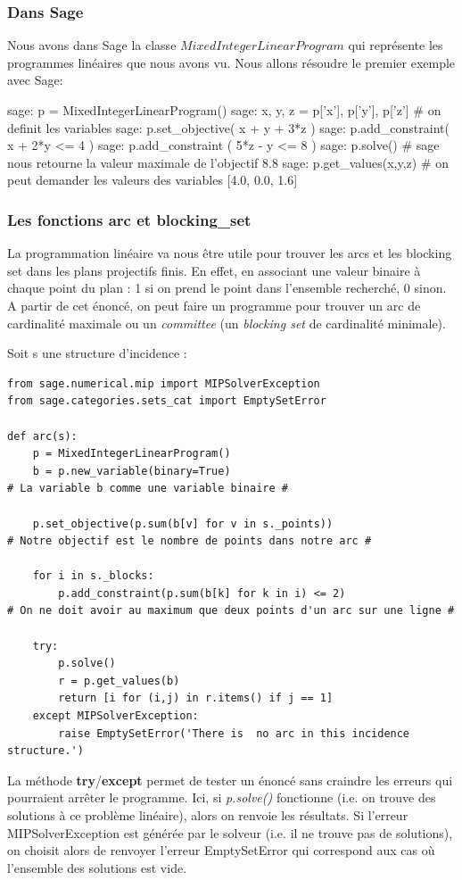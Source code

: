 \documentclass[a4paper]{article}
\begin{document}
\subsubsection{Dans Sage}
Nous avons dans Sage la classe $MixedIntegerLinearProgram$ qui représente les programmes linéaires que nous avons vu.
Nous allons résoudre le premier exemple avec Sage:
\begin{sageverbatim}
sage: p = MixedIntegerLinearProgram()
sage: x, y, z = p['x'], p['y'], p['z']    # on definit les variables
sage: p.set_objective( x + y + 3*z )
sage: p.add_constraint( x + 2*y <= 4 )
sage: p.add_constraint ( 5*z - y <= 8 )
sage: p.solve()         # sage nous retourne la valeur maximale de l'objectif
8.8
sage: p.get_values(x,y,z)    # on peut demander les valeurs des variables
[4.0, 0.0, 1.6]
\end{sageverbatim}
\subsubsection{Les fonctions arc et blocking\_set}
La programmation linéaire va nous être utile pour trouver les arcs et les blocking set dans les plans projectifs finis. En effet, en associant une valeur binaire à chaque point du plan : 1 si on prend le point dans l'ensemble recherché, 0 sinon.\\
A partir de cet énoncé, on peut faire un programme pour trouver un arc de cardinalité maximale ou un \textit{committee} (un \textit{blocking set} de cardinalité minimale).

Soit s une structure d'incidence :

\begin{lstlisting}
from sage.numerical.mip import MIPSolverException
from sage.categories.sets_cat import EmptySetError
          
def arc(s):   
    p = MixedIntegerLinearProgram()
    b = p.new_variable(binary=True)
# La variable b comme une variable binaire #

    p.set_objective(p.sum(b[v] for v in s._points))
# Notre objectif est le nombre de points dans notre arc #

    for i in s._blocks:
        p.add_constraint(p.sum(b[k] for k in i) <= 2)
# On ne doit avoir au maximum que deux points d'un arc sur une ligne #
        
    try:
        p.solve()
        r = p.get_values(b)
        return [i for (i,j) in r.items() if j == 1]
    except MIPSolverException:
        raise EmptySetError('There is  no arc in this incidence structure.')
\end{lstlisting}
La méthode \textbf{try}/\textbf{except} permet de tester un énoncé sans craindre les erreurs qui pourraient arrêter le programme. Ici, si \textit{p.solve()} fonctionne (i.e. on trouve des solutions à ce problème linéaire), alors on renvoie les résultats. Si l'erreur MIPSolverException est générée par le solveur (i.e. il ne trouve pas de solutions), on choisit alors de renvoyer l'erreur EmptySetError qui correspond aux cas où l'ensemble des solutions est vide.
\end{document}
